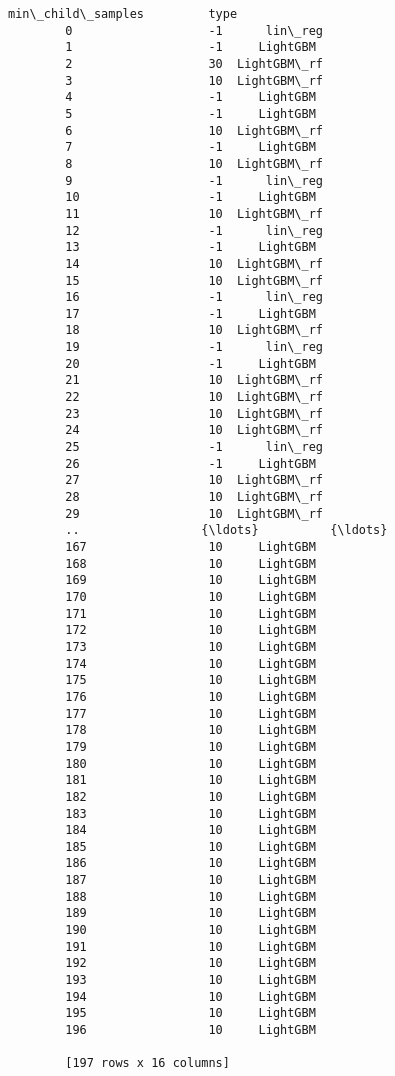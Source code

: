 \documentclass[11pt]{article}
\begin{document}
\begin{Verbatim}[commandchars=\\\{\}]
             min\_child\_samples         type  
        0                   -1      lin\_reg  
        1                   -1     LightGBM  
        2                   30  LightGBM\_rf  
        3                   10  LightGBM\_rf  
        4                   -1     LightGBM  
        5                   -1     LightGBM  
        6                   10  LightGBM\_rf  
        7                   -1     LightGBM  
        8                   10  LightGBM\_rf  
        9                   -1      lin\_reg  
        10                  -1     LightGBM  
        11                  10  LightGBM\_rf  
        12                  -1      lin\_reg  
        13                  -1     LightGBM  
        14                  10  LightGBM\_rf  
        15                  10  LightGBM\_rf  
        16                  -1      lin\_reg  
        17                  -1     LightGBM  
        18                  10  LightGBM\_rf  
        19                  -1      lin\_reg  
        20                  -1     LightGBM  
        21                  10  LightGBM\_rf  
        22                  10  LightGBM\_rf  
        23                  10  LightGBM\_rf  
        24                  10  LightGBM\_rf  
        25                  -1      lin\_reg  
        26                  -1     LightGBM  
        27                  10  LightGBM\_rf  
        28                  10  LightGBM\_rf  
        29                  10  LightGBM\_rf  
        ..                 {\ldots}          {\ldots}  
        167                 10     LightGBM  
        168                 10     LightGBM  
        169                 10     LightGBM  
        170                 10     LightGBM  
        171                 10     LightGBM  
        172                 10     LightGBM  
        173                 10     LightGBM  
        174                 10     LightGBM  
        175                 10     LightGBM  
        176                 10     LightGBM  
        177                 10     LightGBM  
        178                 10     LightGBM  
        179                 10     LightGBM  
        180                 10     LightGBM  
        181                 10     LightGBM  
        182                 10     LightGBM  
        183                 10     LightGBM  
        184                 10     LightGBM  
        185                 10     LightGBM  
        186                 10     LightGBM  
        187                 10     LightGBM  
        188                 10     LightGBM  
        189                 10     LightGBM  
        190                 10     LightGBM  
        191                 10     LightGBM  
        192                 10     LightGBM  
        193                 10     LightGBM  
        194                 10     LightGBM  
        195                 10     LightGBM  
        196                 10     LightGBM  
        
        [197 rows x 16 columns]
\end{Verbatim}
            
\end{document}
